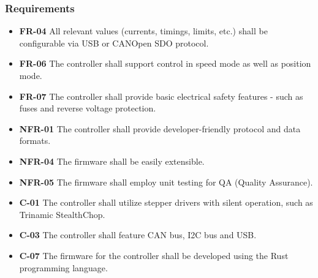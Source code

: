 \documentclass[%
  12pt,       				%
	t,                  %
	aspectratio=1610,   %
	unicode,						%
]{beamer}				    	%
\begin{document}
\begin{frame}
	\frametitle{Requirements}
	\begin{itemize}
		\item \textbf{FR-04} All relevant values (currents, timings, limits, etc.) shall be configurable via USB or CANOpen SDO protocol.
		\item \textbf{FR-06} The controller shall support control in speed mode as well as position mode.
		\item \textbf{FR-07} The controller shall provide basic electrical safety features - such as fuses and reverse voltage protection.
		\item \textbf{NFR-01} The controller shall provide developer-friendly protocol and data formats.
		\item \textbf{NFR-04} The firmware shall be easily extensible.
		\item \textbf{NFR-05} The firmware shall employ unit testing for QA (Quality Assurance).
		\item \textbf{C-01} The controller shall utilize stepper drivers with silent operation, such as Trinamic StealthChop\texttrademark.
		\item \textbf{C-03} The controller shall feature CAN bus, I2C bus and USB.
		\item \textbf{C-07} The firmware for the controller shall be developed using the Rust programming language.
	\end{itemize}
\end{frame}
\end{document}
